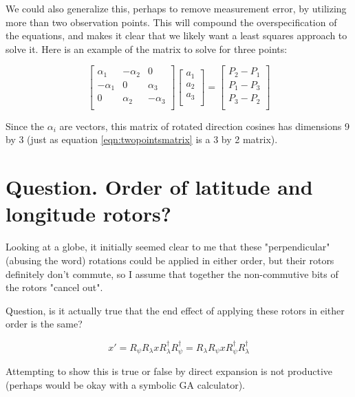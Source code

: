 \documentclass{article}      %
\begin{document}
We could also generalize this, perhaps to remove measurement error, by utilizing more than two observation points.  This will compound the overspecification of the equations, and makes it clear that we likely want a least squares approach to solve it.
Here is an example of the matrix to solve for three points:

\begin{equation}\label{eqn:threepointsmatrix}
\begin{bmatrix}
\alpha_1 & -\alpha_2 & 0 \\
-\alpha_1 & 0 & \alpha_3 \\
0 & \alpha_2 & -\alpha_3 \\
\end{bmatrix}
\begin{bmatrix}
a_1 \\
a_2 \\
a_3 \\
\end{bmatrix}
= 
\begin{bmatrix}
P_2 - P_1 \\
P_1 - P_3 \\
P_3 - P_2 \\
\end{bmatrix}
\end{equation}

Since the $\alpha_i$ are vectors, this matrix of rotated direction cosines has dimensions 9 by 3 (just as equation \ref{eqn:twopointsmatrix} is a 3 by 2 matrix).

\section{ Question.  Order of latitude and longitude rotors? }

Looking at a globe, it initially seemed clear to me that these "perpendicular" (abusing the word) rotations could be applied in either order, but their rotors definitely don't commute, so I assume that together the non-commutive bits of the rotors "cancel out".

Question, is it actually true that the end effect of applying these rotors in either order is the same?

\[
x' = R_{\psi} R_{\lambda} x R_{\lambda}^\dagger R_{\psi}^\dagger = R_{\lambda} R_{\psi} x R_{\psi}^\dagger R_{\lambda}^\dagger
\]

Attempting to show this is true or false by direct expansion is not productive (perhaps would be okay with a symbolic GA calculator).
\end{document}
